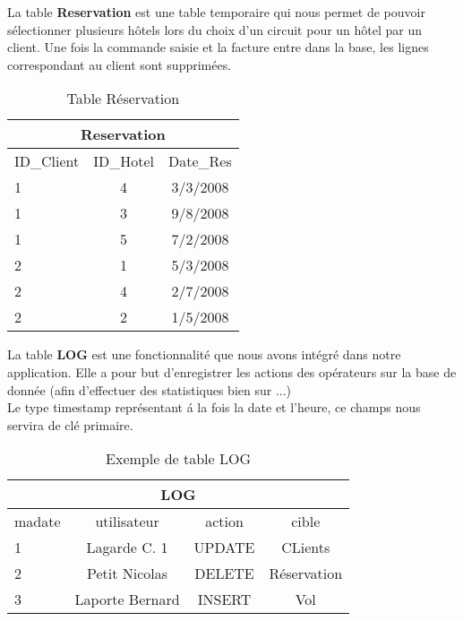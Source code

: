 
\begin{table}[h]
La table \textbf{Reservation} est une table temporaire qui nous permet de pouvoir s\'electionner plusieurs h\^otels lors du choix d'un circuit pour un h\^otel par un client. Une fois la commande saisie et la facture entre dans la base, les lignes correspondant au client sont supprim\'ees.
\begin{center}
\begin{tabular}{|l|c|c|}
\hline
\multicolumn{3}{|c|}{Reservation}\\
\hline
ID\_Client& ID\_Hotel&Date\_Res\\
\hline
1 & 4&3/3/2008\\
\hline
1 & 3&9/8/2008\\
\hline
1 & 5&7/2/2008\\
\hline
2 & 1&5/3/2008\\
\hline
2&4&2/7/2008\\
\hline
2 & 2&1/5/2008\\
\hline
\end{tabular}
\end{center}
\caption{Table R\'eservation}
\end{table}

\begin{table}[h]
 La table \textbf{LOG} est une fonctionnalit\'e que nous avons int\'egr\'e dans notre application. Elle a pour but d'enregistrer les actions des op\'erateurs sur la base de donn\'ee (afin d'effectuer des statistiques bien sur ...)\\
Le type timestamp repr\'esentant \'a la fois la date et l'heure, ce champs nous servira de cl\'e primaire.
\begin{center}
\begin{tabular}{|l|c|c|c|}
\hline
\multicolumn{4}{|c|}{LOG}\\
\hline
madate&utilisateur&action&cible\\
\hline
1 &Lagarde C. 1&UPDATE&CLients\\
\hline
2 &Petit Nicolas&DELETE&R\'eservation\\
\hline
3 &Laporte Bernard&INSERT&Vol\\
\hline
\end{tabular}
\end{center}
\caption{Exemple de table LOG}
\end{table}
\newpage

